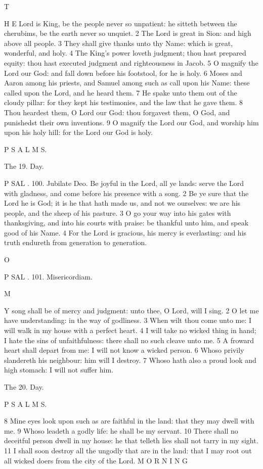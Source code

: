 T

H E Lord is King, be the people never so unpatient: he sitteth between the cherubims, be the earth never so unquiet. 2 The Lord is great in Sion: and high above all people. 3 They shall give thanks unto thy Name: which is great, wonderful, and holy. 4 The King’s power loveth judgment; thou hast prepared equity: thou hast executed judgment and righteousness in Jacob. 5 O magnify the Lord our God: and fall down before his footstool, for he is holy. 6 Moses and Aaron among his priests, and Samuel among such as call upon his Name: these called upon the Lord, and he heard them. 7 He spake unto them out of the cloudy pillar: for they kept his testimonies, and the law that he gave them. 8 Thou heardest them, O Lord our God: thou forgavest them, O God, and punishedst their own inventions. 9 O magnify the Lord our God, and worship him upon his holy hill: for the Lord our God is holy.

P S A L M S.

The 19. Day.

P SAL . 100. Jubilate Deo. Be joyful in the Lord, all ye lands: serve the Lord with gladness, and come before his presence with a song. 2 Be ye sure that the Lord he is God; it is he that hath made us, and not we ourselves: we are his people, and the sheep of his pasture. 3 O go your way into his gates with thanksgiving, and into his courts with praise: be thankful unto him, and speak good of his Name. 4 For the Lord is gracious, his mercy is everlasting: and his truth endureth from generation to generation.

O

P SAL . 101. Misericordiam.

M

Y song shall be of mercy and judgment: unto thee, O Lord, will I sing. 2 O let me have understanding: in the way of godliness. 3 When wilt thou come unto me: I will walk in my house with a perfect heart. 4 I will take no wicked thing in hand; I hate the sins of unfaithfulness: there shall no such cleave unto me. 5 A froward heart shall depart from me: I will not know a wicked person. 6 Whoso privily slandereth his neighbour: him will I destroy. 7 Whoso hath also a proud look and high stomach: I will not suffer him.

The 20. Day.

P S A L M S.

8 Mine eyes look upon such as are faithful in the land: that they may dwell with me. 9 Whoso leadeth a godly life: he shall be my servant. 10 There shall no deceitful person dwell in my house: he that telleth lies shall not tarry in my sight. 11 I shall soon destroy all the ungodly that are in the land: that I may root out all wicked doers from the city of the Lord. M O R N I N G

